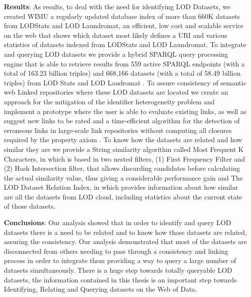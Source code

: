 \textbf{Results}:
As results, to deal with the need for identifying LOD Datasets, we created WIMU\cite{valdestilhas2018my} a regularly updated database index of more than 660K datasets from LODStats and LOD Laundromat, an efficient, low cost and scalable service on the web that shows which dataset most likely defines a URI and various statistics of datasets indexed from LODStats and LOD Laundromat. To integrate and querying LOD datasets we provide a hybrid SPARQL query processing engine that is able to retrieve results from 559 active SPARQL endpoints (with a total of 163.23 billion triples) and 668,166 datasets (with a total of 58.49 billion triples) from LOD Stats and LOD Laudromat \cite{ValdestilhasKcap}. To assure consistency of semantic web Linked repositories where these LOD datasets are located we create an approach for the mitigation of the identifier heterogeneity problem and implement a prototype where the user is able to evaluate existing links, as well as suggest new links to be rated and a time-efficient algorithm for the detection of erroneous links in large-scale link repositories without computing all closures required by the property axiom \cite{valdestilhasdbpediasameas, valdestilhas2017cedal}. To  know how the datasets are related and how similar they are we provide a String similarity algorithm called Most Frequent K Characters, in which is based in two nested filters, (1) First Frequency Filter and (2) Hash Intersection filter, that allows discarding candidates before calculating the actual similarity value, thus giving a considerable performance gain \cite{valdestilhas2017high} and The LOD Dataset Relation Index, in which provides information about how similar are all the datasets from LOD cloud, including statistics about the current state of those datasets.

\textbf{Conclusions}:
Our analysis showed that in order to identify and query LOD datasets there is a need to be related and to know how those datasets are related, assuring the consistency. Our analysis demonstrated that most of the datasets are disconnected from others needing to pass through a consistency and linking process in order to integrate them providing a way to query a large number of datasets simultaneously. There is a huge step towards totally queryable LOD datasets, the information contained in this thesis is an important step towards Identifying, Relating and Querying datasets on the Web of Data.
